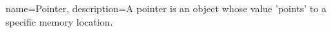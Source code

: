 {
    name=Pointer,
    description={A pointer is an object whose value 'points' to a specific memory location.}
}

